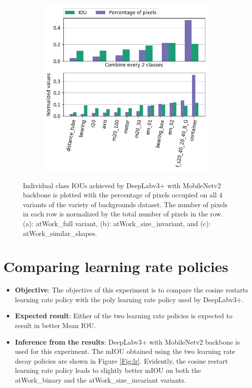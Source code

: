 \begin{figure}
\begin{subfigure}{.47\textwidth}
				\includegraphics[width=1\linewidth]{images/cls_iou_shape}
				\caption{}
				\label{Fig:clsiouc}
			\end{subfigure}
			\caption{Individual class IOUs achieved by DeepLabv3+ with MobileNetv2 backbone is plotted with the percentage of pixels occupied on all 4 variants of the variety of backgrounds dataset. The number of pixels in each row is normalized by the total number of pixels in the row. (a): atWork\_full variant, (b): atWork\_size\_invariant, and (c): atWork\_similar\_shapes.}
			\label{Fig:clsiou}
		\end{figure}

\section{Comparing learning rate policies}
\label{section:lr}
	
	\begin{itemize}
		\item \textbf{Objective}: The objective of this experiment is to compare the cosine restarts \cite{DBLP:journals/corr/LoshchilovH16a} learning rate policy with the poly learning rate policy used by DeepLabv3+.
		\item \textbf{Expected result}: Either of the two learning rate policies is expected to result in better Mean IOU.
		\item \textbf{Inference from the results}: DeepLabv3+ with MobileNetv2 backbone is used for this experiment. The mIOU obtained using the two learning rate decay policies are shown in Figure \ref{Fig:lr}. Evidently, the cosine restart learning rate policy leads to slightly better mIOU on both the atWork\_binary and the atWork\_size\_invariant variants.
	\end{itemize}
	
